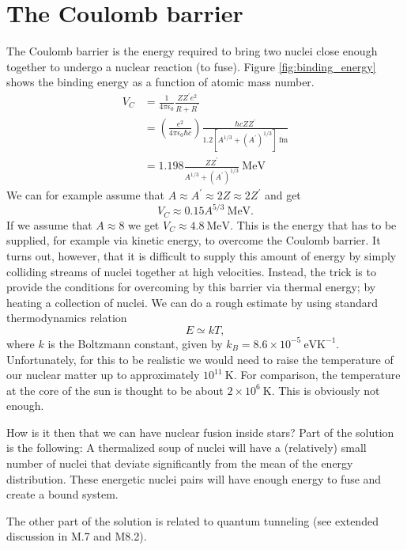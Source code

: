 \documentclass[a4paper,12pt]{article}
\theoremstyle{remark}
\newcommand{\mrm}[1]{\mathrm{#1}}
\renewcommand{\=}[1]{\stackrel{#1}{=}} %
\theoremstyle{plain}
\theoremstyle{definition}
\begin{document}
\section{The Coulomb barrier }
The Coulomb barrier is the energy required to bring two nuclei close enough together to undergo a nuclear reaction (to fuse). Figure \ref{fig:binding_energy} shows the binding energy as a function of atomic mass number.
\begin{align}
V_C &= \frac{1}{4\pi\epsilon _0} \frac{Z Z^{\prime} e^{2}}{R+R^{\prime}} \nonumber \\[4pt]
 &= \left( \frac{e^{2}}{4\pi\epsilon _0 \hbar c} \right) \frac{\hbar c ZZ^\prime}{1.2[A^{1/3} + (A^\prime)^{1/3}] \:\mrm{fm}} \nonumber \\[4pt]
 &= 1.198 \frac{Z Z^\prime}{A^{1/3} + (A^\prime)^{1/3}} \:\mrm{MeV}
\end{align} 
We can for example assume that $A \approx A^\prime \approx 2Z \approx 2Z^\prime$ and get 
\begin{equation}
V_C \approx 0.15 A^{5/3} \:\mrm{MeV}.
\end{equation}
If we assume that $A \approx 8$ we get $V_C \approx 4.8 \:\mrm{MeV}$. This is the energy that has to be supplied, for example via kinetic energy, to overcome the Coulomb barrier. It turns out, however, that it is difficult to supply this amount of energy by simply colliding streams of nuclei together at high velocities. Instead, the trick is to provide the conditions for overcoming by this barrier via thermal energy; by heating a collection of nuclei. We can do a rough estimate by using standard thermodynamics relation 
\begin{equation}
E \simeq kT,
\end{equation}
where $k$ is the Boltzmann constant, given by $k_B = 8.6 \times 10^{-5} \: \mrm{eV K}^{-1}$. Unfortunately, for this to be realistic we would need to raise the temperature of our nuclear matter up to approximately $10^{11} \:\mrm{K}$. For comparison, the temperature at the core of the sun is thought to be about $2 \times 10^{6} \:\mrm{K}$. This is obviously not enough. 

How is it then that we can have nuclear fusion inside stars? Part of the solution is the following: A thermalized soup of nuclei will have a (relatively) small number of nuclei that deviate significantly from the mean of the energy distribution. These energetic nuclei pairs will have enough energy to fuse and create a bound system.

The other part of the solution is related to quantum tunneling (see extended discussion in M.7 and M8.2).
\end{document}

